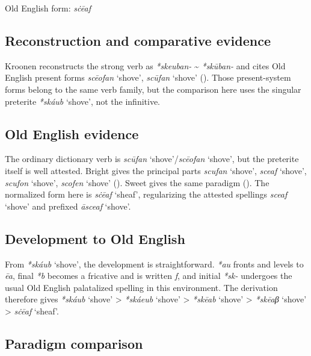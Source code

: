 \documentclass[
  british,
  a4paper,
  openany]{book}
\providecommand{\Recon}[1]{\emph{*#1}}
{\catcode`→=\active \global\def→{\ensuremath{\rightarrow}}}
\providecommand{\Recon}[1]{\emph{*#1}}
{\catcode`→=\active \global\def→{\ensuremath{\rightarrow}}}
\begin{document}
Old English form: \emph{sċēaf}

\subsection{Reconstruction and comparative
evidence}\label{reconstruction-and-comparative-evidence-123}

Kroonen reconstructs the strong verb as \emph{*skeuban-}
\textasciitilde{} \emph{*skūban-} and cites Old English present forms
{\emph{scēofan}} `shove', {\emph{scūfan}} `shove'
(). Those present-system
forms belong to the same verb family, but the comparison here uses the
singular preterite {\Recon{skáub} `shove'}, not the infinitive.

\subsection{Old English evidence}\label{old-english-evidence-123}

The ordinary dictionary verb is {\emph{scūfan}} `shove'/{\emph{scēofan}}
`shove', but the preterite itself is well attested. Bright gives the
principal parts {\emph{scufan}} `shove', {\emph{sceaf}} `shove',
{\emph{scufon}} `shove', {\emph{scofen}} `shove'
(). Sweet gives
the same paradigm (). The
normalized form here is {\emph{sċēaf}} `sheaf', regularizing the
attested spellings {\emph{sceaf}} `shove' and prefixed {\emph{āsceaf}}
`shove'.

\subsection{Development to Old
English}\label{development-to-old-english-123}

From \Recon{skáub} `shove', the development is straightforward.
\emph{*au} fronts and levels to \emph{ēa}, final \emph{*b} becomes a
fricative and is written \emph{f}, and initial \emph{*sk-} undergoes the
usual Old English palatalized spelling in this environment. The
derivation therefore gives \Recon{skáub} `shove' \textgreater{}
\Recon{skáeub} `shove' \textgreater{} \Recon{skēab} `shove'
\textgreater{} \Recon{skēaβ} `shove' \textgreater{} {\emph{sċēaf}}
`sheaf'.

\subsection{Paradigm comparison}\label{paradigm-comparison-15}
\end{document}
